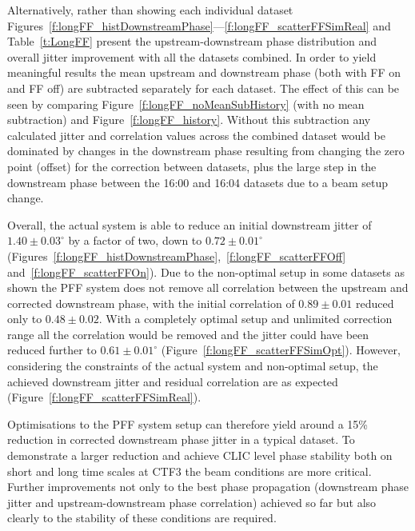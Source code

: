 Alternatively, rather than showing each individual dataset Figures~\ref{f:longFF_histDownstreamPhase}---\ref{f:longFF_scatterFFSimReal} and Table~\ref{t:LongFF} present the upstream-downstream phase distribution and overall jitter improvement with all the datasets combined. In order to yield meaningful results the mean upstream and downstream phase (both with FF on and FF off) are subtracted separately for each dataset. The effect of this can be seen by comparing Figure~\ref{f:longFF_noMeanSubHistory} (with no mean subtraction) and Figure~\ref{f:longFF_history}. Without this subtraction any calculated jitter and correlation values across the combined dataset would be dominated by changes in the downstream phase resulting from changing the zero point (offset) for the correction between datasets, plus the large step in the downstream phase between the 16:00 and 16:04 datasets due to a beam setup change.

Overall, the actual system is able to reduce an initial downstream jitter of \(1.40\pm0.03^\circ\) by a factor of two, down to \(0.72\pm0.01^\circ\) (Figures~\ref{f:longFF_histDownstreamPhase},~\ref{f:longFF_scatterFFOff} and~\ref{f:longFF_scatterFFOn}). Due to the non-optimal setup in some datasets as shown the PFF system does not remove all correlation between the upstream and corrected downstream phase, with the initial correlation of \(0.89\pm0.01\) reduced only to \(0.48\pm0.02\). With a completely optimal setup and unlimited correction range all the correlation would be removed and the jitter could have been reduced further to \(0.61\pm0.01^\circ\) (Figure~\ref{f:longFF_scatterFFSimOpt}). However, considering the constraints of the actual system and non-optimal setup, the achieved downstream jitter and residual correlation are as expected (Figure~\ref{f:longFF_scatterFFSimReal}).

Optimisations to the PFF system setup can therefore yield around a 15\% reduction in corrected downstream phase jitter in a typical dataset. To demonstrate a larger reduction and achieve CLIC level phase stability both on short and long time scales at CTF3 the beam conditions are more critical. Further improvements not only to the best phase propagation (downstream phase jitter and upstream-downstream phase correlation) achieved so far but also clearly to the stability of these conditions are required.

